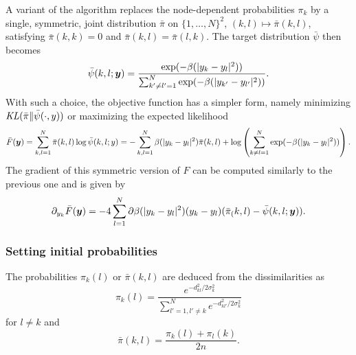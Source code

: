 \bigskip
A variant of the algorithm replaces the node-dependent probabilities $\pi_k$ by a single, symmetric, joint distribution $\bar\pi$ on $\{1, \ldots, N\}^2$, $(k,l) \mapsto \bar\pi(k,l)$, satisfying $\bar\pi(k,k) = 0$ and $\bar\pi(k,l) = \bar\pi(l,k)$.  The target distribution $\bar\psi$ then becomes 
\[
\bar\psi(k,l;{\bm{y}}) =    \frac{\exp(-\beta(|y_k-y_l|^2))}{\sum_{k'\neq l'=1}^N \exp(-\beta(|y_{k'} - y_{l'}|^2))}.
\]
With such a choice, the objective function has a simpler form,  namely minimizing $\mathit{KL}(\bar\pi\|\bar\psi(\cdot, y))$ or maximizing the expected likelihood
\[
\bar F({\bm{y}}) = \sum_{k,l=1}^N \bar \pi(k,l) \log\bar \psi(k,l; y) = -\sum_{k,l=1}^N \beta(|y_k-y_l|^2) \bar\pi(k,l) + \log \left(\sum_{k\neq l=1}^N \exp(-\beta(|y_k-y_l|^2))\right).
\] 
The gradient of this symmetric version of $F$ can be computed similarly to the previous one and is given by
\[
\partial_{y_k} \bar F({\bm{y}}) = -4  \sum_{l=1}^N \partial\beta(|y_k-y_l|^2) (y_k - y_l) (\bar\pi_(k, l) - \bar\psi(k, l;{\bm{y}})).
\]

\subsubsection{Setting initial probabilities}

The probabilities $\pi_k(l)$ or $\bar\pi(k,l)$ are deduced from the dissimilarities as
\[
\pi_k(l) = \frac{e^{-d_{kl}^2/2\sigma^2_k}}{\sum_{l'=1, l'\neq k}^Ne^{-d_{kl'}^2/2\sigma^2_k}}
\]
for $l\neq k$ and 
\[
\bar\pi(k,l) = \frac{\pi_k(l) + \pi_l(k)}{2n}.
\]

